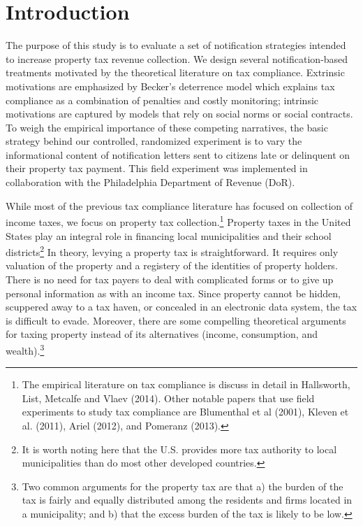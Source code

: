 \documentclass[12pt,titlepage]{article}
\begin{document}
\section{Introduction}

The purpose of this study is to evaluate a set of notification
strategies intended to increase property tax revenue collection.  We
design several notification-based treatments motivated by the
theoretical literature on tax compliance.  Extrinsic motivations are
emphasized by Becker's deterrence model which explains tax
compliance as a combination of penalties and costly
monitoring; intrinsic motivations are captured by models that rely on
social norms or social contracts. 
To weigh the empirical importance of these competing narratives, the basic strategy behind our
controlled, randomized experiment is to vary the informational content
of notification letters sent to citizens late or delinquent on their property tax payment.
This field experiment was implemented in collaboration with the Philadelphia 
Department of Revenue (DoR).

While most of the previous tax compliance literature has focused on
collection of income taxes, we focus on property tax
collection.\footnote{The empirical literature on tax compliance is
  discuss in detail in Hallsworth, List, Metcalfe and Vlaev (2014).
  Other notable papers that use field experiments to study tax
  compliance are Blumenthal et al (2001), Kleven et al. (2011), Ariel
  (2012), and Pomeranz (2013).}  Property taxes in the United States play an integral role
in financing local municipalities and their school
districts\footnote{It is worth noting here that the U.S. provides more tax authority to local
  municipalities than do most other developed countries.} %
  In theory,
levying a property tax is straightforward.  It requires only
valuation of the property and a registery of the identities of
property holders. There is no need for tax payers to deal with
complicated forms or to give up personal information as with an income
tax.  Since property cannot be hidden, scuppered away to a tax haven, or
concealed in an electronic data system, the tax is difficult to evade.
Moreover, there are some compelling theoretical arguments for
taxing property instead of its alternatives (income, consumption, and
wealth).\footnote{Two common arguments for the property tax are that
  a) the burden of the tax is fairly and equally distributed among the
  residents and firms located in a municipality; and b) that the
  excess burden of the tax is likely to be low.}
\end{document}
